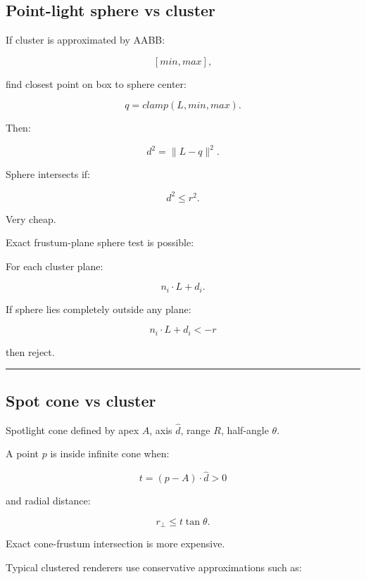 \subsection{Point-light sphere vs cluster}\label{04-visual-computing-ii-ch040-point-light-sphere-vs-cluster}

\hypertarget{04-visual-computing-ii-ch040-point-light-sphere-vs-cluster}{}

If cluster is approximated by AABB:

\[
[min,max],
\]

find closest point on box to sphere center:

\[
q=
clamp(
L,
min,
max
).
\]

Then:

\[
d^2=
\|L-q\|^2.
\]

Sphere intersects if:

\[
\boxed{
d^2\le r^2.
}
\]

Very cheap.

Exact frustum-plane sphere test is possible:

For each cluster plane:

\[
n_i\cdot L+d_i.
\]

If sphere lies completely outside any plane:

\[
n_i\cdot L+d_i<-r
\]

then reject.

\begin{center}\rule{0.5\linewidth}{0.5pt}\end{center}

\subsection{Spot cone vs cluster}\label{04-visual-computing-ii-ch040-spot-cone-vs-cluster}

\hypertarget{04-visual-computing-ii-ch040-spot-cone-vs-cluster}{}

Spotlight cone defined by apex \(A\), axis \(\hat d\), range \(R\), half-angle \(\theta\).

A point \(p\) is inside infinite cone when:

\[
t=
(p-A)\cdot\hat d>0
\]

and radial distance:

\[
r_\perp
\le
t\tan\theta.
\]

Exact cone-frustum intersection is more expensive.

Typical clustered renderers use conservative approximations such as:

